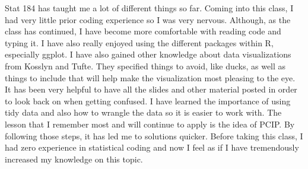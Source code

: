 \documentclass[
]{article}
\begin{document}
Stat 184 has taught me a lot of different things so far. Coming into
this class, I had very little prior coding experience so I was very
nervous. Although, as the class has continued, I have become more
comfortable with reading code and typing it. I have also really enjoyed
using the different packages within R, especially ggplot. I have also
gained other knowledge about data visualizations from Kosslyn and Tufte.
They specified things to avoid, like ducks, as well as things to include
that will help make the visualization most pleasing to the eye. It has
been very helpful to have all the slides and other material posted in
order to look back on when getting confused. I have learned the
importance of using tidy data and also how to wrangle the data so it is
easier to work with. The lesson that I remember most and will continue
to apply is the idea of PCIP. By following those steps, it has led me to
solutions quicker. Before taking this class, I had zero experience in
statistical coding and now I feel as if I have tremendously increased my
knowledge on this topic.
\end{document}
